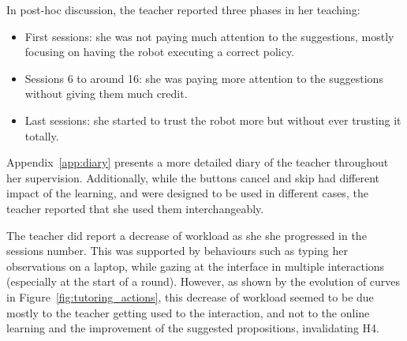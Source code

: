 In post-hoc discussion, the teacher reported three phases in her teaching: 
\begin{itemize}
	\item First sessions: she was not paying much attention to the suggestions, mostly focusing on having the robot executing a correct policy.
	\item Sessions 6 to around 16: she was paying more attention to the suggestions without giving them much credit.
	\item Last sessions: she started to trust the robot more but without ever trusting it totally.
\end{itemize}

Appendix~\ref{app:diary} presents a more detailed diary of the teacher throughout her supervision. Additionally, while the buttons cancel and skip had different impact of the learning, and were designed to be used in different cases, the teacher reported that she used them interchangeably.

The teacher did report a decrease of workload as she she progressed in the sessions number. This was supported by behaviours such as typing her observations on a laptop, while gazing at the interface in multiple interactions (especially at the start of a round). However, as shown by the evolution of curves in Figure~\ref{fig:tutoring_actions}, this decrease of workload seemed to be due mostly to the teacher getting used to the interaction, and not to the online learning and the improvement of the suggested propositions, invalidating H4.

